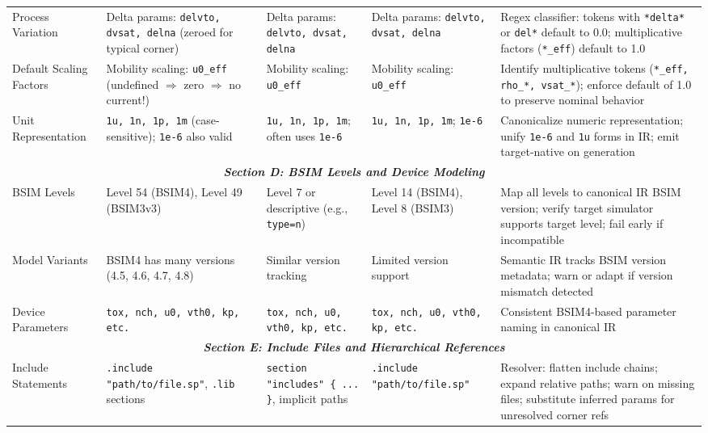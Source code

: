 \begin{table}[!t]
\begin{tabular}{@{}p{2.2cm}p{2.8cm}p{2.8cm}p{2.8cm}p{3.8cm}@{}}
Process Variation & Delta params: \texttt{delvto, dvsat, delna} (zeroed for typical corner) & Delta params: \texttt{delvto, dvsat, delna} & Delta params: \texttt{delvto, dvsat, delna} & Regex classifier: tokens with \texttt{*delta*} or \texttt{del*} default to 0.0; multiplicative factors (\texttt{*\_eff}) default to 1.0 \\

Default Scaling Factors & Mobility scaling: \texttt{u0\_eff} (undefined $\Rightarrow$ zero $\Rightarrow$ no current!) & Mobility scaling: \texttt{u0\_eff} & Mobility scaling: \texttt{u0\_eff} & Identify multiplicative tokens (\texttt{*\_eff, rho\_*, vsat\_*}); enforce default of 1.0 to preserve nominal behavior \\

Unit Representation & \texttt{1u, 1n, 1p, 1m} (case-sensitive); \texttt{1e-6} also valid & \texttt{1u, 1n, 1p, 1m}; often uses \texttt{1e-6} & \texttt{1u, 1n, 1p, 1m}; \texttt{1e-6} & Canonicalize numeric representation; unify \texttt{1e-6} and \texttt{1u} forms in IR; emit target-native on generation \\

\midrule
\multicolumn{5}{c}{\textit{\textbf{Section D: BSIM Levels and Device Modeling}}} \\
\midrule

BSIM Levels & Level 54 (BSIM4), Level 49 (BSIM3v3) & Level 7 or descriptive (e.g., \texttt{type=n}) & Level 14 (BSIM4), Level 8 (BSIM3) & Map all levels to canonical IR BSIM version; verify target simulator supports target level; fail early if incompatible \\

Model Variants & BSIM4 has many versions (4.5, 4.6, 4.7, 4.8) & Similar version tracking & Limited version support & Semantic IR tracks BSIM version metadata; warn or adapt if version mismatch detected \\

Device Parameters & \texttt{tox, nch, u0, vth0, kp, etc.} & \texttt{tox, nch, u0, vth0, kp, etc.} & \texttt{tox, nch, u0, vth0, kp, etc.} & Consistent BSIM4-based parameter naming in canonical IR \\

\midrule
\multicolumn{5}{c}{\textit{\textbf{Section E: Include Files and Hierarchical References}}} \\
\midrule

Include Statements & \texttt{.include "path/to/file.sp"}, \texttt{.lib} sections & \texttt{section "includes" \{ ... \}}, implicit paths & \texttt{.include "path/to/file.sp"} & Resolver: flatten include chains; expand relative paths; warn on missing files; substitute inferred params for unresolved corner refs \\


\end{tabular}
\end{table}
